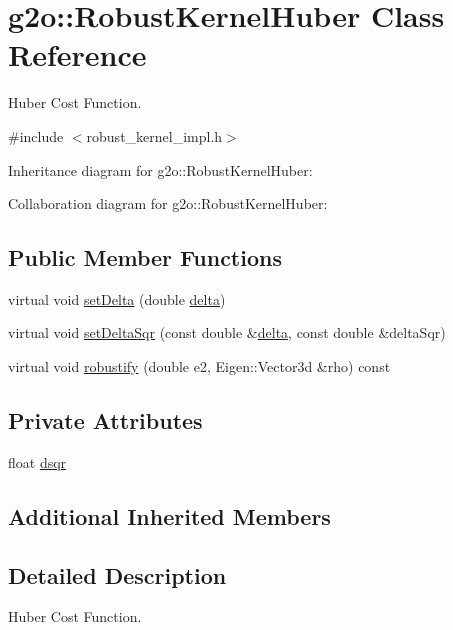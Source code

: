 \hypertarget{classg2o_1_1RobustKernelHuber}{}\section{g2o\+:\+:Robust\+Kernel\+Huber Class Reference}
\label{classg2o_1_1RobustKernelHuber}


Huber Cost Function.  




{\ttfamily \#include $<$robust\+\_\+kernel\+\_\+impl.\+h$>$}



Inheritance diagram for g2o\+:\+:Robust\+Kernel\+Huber\+:


Collaboration diagram for g2o\+:\+:Robust\+Kernel\+Huber\+:
\subsection*{Public Member Functions}
\begin{DoxyCompactItemize}
\item 
virtual void \hyperlink{classg2o_1_1RobustKernelHuber_a7e9ee4bbc9483dcd3d10a4c1f506a4d2}{set\+Delta} (double \hyperlink{classg2o_1_1RobustKernel_a8c94f88f5c97f47c519a9adb44b4da36}{delta})
\item 
virtual void \hyperlink{classg2o_1_1RobustKernelHuber_ad243b5888d71a3573e9f9372abead870}{set\+Delta\+Sqr} (const double \&\hyperlink{classg2o_1_1RobustKernel_a8c94f88f5c97f47c519a9adb44b4da36}{delta}, const double \&delta\+Sqr)
\item 
virtual void \hyperlink{classg2o_1_1RobustKernelHuber_a702ac5453740284ba6addeb41157e45e}{robustify} (double e2, Eigen\+::\+Vector3d \&rho) const 
\end{DoxyCompactItemize}
\subsection*{Private Attributes}
\begin{DoxyCompactItemize}
\item 
float \hyperlink{classg2o_1_1RobustKernelHuber_ada9d48b59d64f72c18b11905de8dca0d}{dsqr}
\end{DoxyCompactItemize}
\subsection*{Additional Inherited Members}


\subsection{Detailed Description}
Huber Cost Function. 

